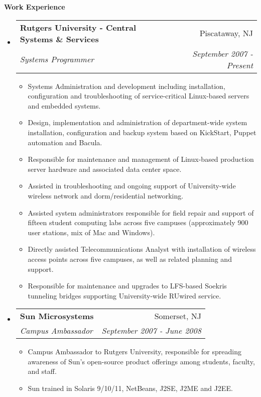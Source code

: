 \documentclass[letterpaper,11pt]{article}
\makeatletter
\newcommand{\resitem}[1]{\item #1 \vspace{-2pt}}
\newcommand{\resheading}[1]{{\large \colorbox{mygrey}{\begin{minipage}{\textwidth}{\textbf{#1 \vphantom{p\^{E}}}}\end{minipage}}}}
\newcommand{\ressubheading}[4]{
\begin{tabular*}{7.0in}{l@{\extracolsep{\fill}}r}
		\textbf{#1} & #2 \\
		\textit{#3} & \textit{#4} \\
\end{tabular*}\vspace{-6pt}}
\makeatother
\begin{document}
\resheading{Work Experience}
\begin{itemize}
\item
	\ressubheading{Rutgers University - Central Systems \& Services}{Piscataway, NJ}{Systems Programmer}{September 2007 - Present}
	\begin{itemize}
                \resitem{Systems Administration and development including
                  installation, configuration and troubleshooting of
                  service-critical Linux-based servers and embedded systems.}
                \resitem{Design, implementation and administration of department-wide system
                  installation, configuration and backup system based on
                  KickStart, Puppet automation and Bacula.}
                \resitem{Responsible for maintenance and management of
                  Linux-based production server hardware and associated data center space.}
                \resitem{Assisted in troubleshooting and ongoing support of
                  University-wide wireless network and dorm/residential networking.}
                \resitem{Assisted system administrators responsible for field
                  repair and support of fifteen student computing 
                  labs across five campuses (approximately 900 user stations,
                  mix of Mac and Windows).}
                \resitem{Directly assisted Telecommunications Analyst with
                  installation of wireless access
                  points across five campuses, as well as related planning and
                  support.}
                \resitem{Responsible for maintenance and upgrades to LFS-based
                  Soekris tunneling bridges supporting University-wide RUwired
                  service.}
	\end{itemize}

\item
        \ressubheading{Sun Microsystems}{Somerset, NJ}{Campus Ambassador}{September 2007 - June 2008}
        \begin{itemize}
                \resitem{Campus Ambassador to Rutgers University, responsible
                  for spreading awareness of Sun's open-source product
                  offerings among students, faculty, and staff.}
                \resitem{Sun trained in Solaris 9/10/11,
                  NetBeans, J2SE, J2ME and J2EE. }
        \end{itemize}


\end{itemize}
\end{document}
